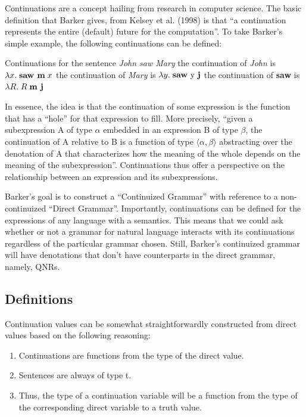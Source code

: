 \documentclass[11pt]{article}
\begin{document}
Continuations are a concept hailing from research in computer science. The basic definition that Barker gives, from Kelsey et al. (1998) is that ``a continuation represents the entire (default) future for the computation''. To take Barker's simple example, the following continuations can be defined:
    
    \pex Continuations for the sentence \textit{John saw Mary}
    \a the continuation of \textit{John} is $\lambda x. \; \textrm{\textbf{saw m}} \; x$
    \a the continuation of \textit{Mary} is $\lambda y . \; \textrm{\textbf{saw} y \textrm{\textbf{j}}}$
    \a the continuation of \textbf{saw} is $\lambda R . \; R \; \textrm{\textbf{m j}}$
    \xe
    
In essence, the idea is that the continuation of some expression is the function that has a ``hole'' for that expression to fill. More precisely, ``given a subexpression A of type $\alpha$ embedded in an expression B of type $\beta$, the continuation of A relative to B is a function of type $\langle \alpha, \beta \rangle$ abstracting over the denotation of A that characterizes how the meaning of the whole depends on the meaning of the subexpression''. Continuations thus offer a perspective on the relationship between an expression and its subexpressions.
    
Barker's goal is to construct a ``Continuized Grammar'' with reference to a non-continuized ``Direct Grammar''. Importantly, continuations can be defined for the expressions of any language with a semantics. This means that we could ask whether or not a grammar for natural language interacts with its continuations regardless of the particular grammar chosen. Still, Barker's continuized grammar will have denotations that don't have counterparts in the direct grammar, namely, QNRs.

\subsection{Definitions}

Continuation values can be somewhat straightforwardly constructed from direct values based on the following reasoning:
    
\begin{enumerate}
    \item Continuations are functions from the type of the direct value.
    \item Sentences are always of type \textsf{t}.
    \item Thus, the type of a continuation variable will be a function from the type of the corresponding direct variable to a truth value.
\end{enumerate}
    
\end{document}

